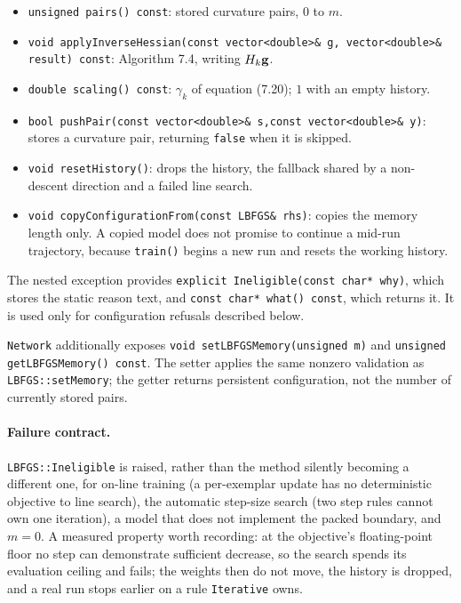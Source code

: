 \begin{itemize}
      single iteration may cost many full passes.
\item \texttt{unsigned pairs() const}: stored curvature pairs, $0$ to $m$.
\item \texttt{void applyInverseHessian(const vector<double>\& g,
      vector<double>\& result) const}: Algorithm 7.4, writing $H_k{\bf g}$.
\item \texttt{double scaling() const}: $\gamma_k$ of equation (7.20); $1$ with
      an empty history.
\item \texttt{bool pushPair(const vector<double>\& s,const vector<double>\& y)}:
      stores a curvature pair, returning \texttt{false} when it is skipped.
\item \texttt{void resetHistory()}: drops the history, the fallback shared by a
      non-descent direction and a failed line search.
\item \texttt{void copyConfigurationFrom(const LBFGS\& rhs)}: copies the memory
      length only.  A copied model does not promise to continue a mid-run
      trajectory, because \texttt{train()} begins a new run and resets the
      working history.
\end{itemize}

The nested exception provides
\texttt{explicit Ineligible(const char* why)}, which stores the static reason
text, and \texttt{const char* what() const}, which returns it. It is used only
for configuration refusals described below.

\texttt{Network} additionally exposes
\texttt{void setLBFGSMemory(unsigned m)} and
\texttt{unsigned getLBFGSMemory() const}. The setter applies the same nonzero
validation as \texttt{LBFGS::setMemory}; the getter returns persistent
configuration, not the number of currently stored pairs.

\paragraph{Failure contract.}  \texttt{LBFGS::Ineligible} is raised, rather than
the method silently becoming a different one, for on-line training (a
per-exemplar update has no deterministic objective to line search), the
automatic step-size search (two step rules cannot own one iteration), a model
that does not implement the packed boundary, and $m = 0$.  A measured property
worth recording: at the objective's floating-point floor no step can demonstrate
sufficient decrease, so the search spends its evaluation ceiling and fails; the
weights then do not move, the history is dropped, and a real run stops earlier
on a rule \texttt{Iterative} owns.

